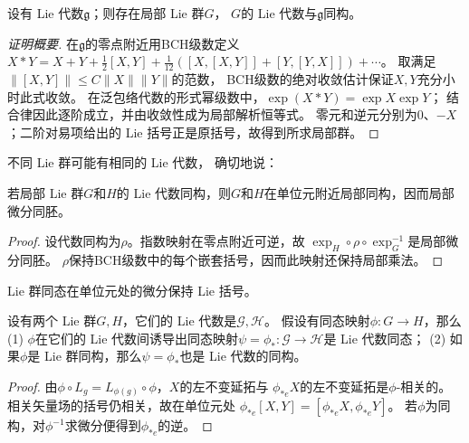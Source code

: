 \begin{theorem}\label{chlg:thm_Lie3inv}
    设有 Lie 代数$\mathfrak{g}$；则存在局部 Lie 群$G$，
    $G$的 Lie 代数与$\mathfrak{g}$同构。
\end{theorem}
\begin{proof}[证明概要]
在$\mathfrak g$的零点附近用BCH级数定义
$X*Y=X+Y+\tfrac12[X,Y]+\tfrac1{12}([X,[X,Y]]+[Y,[Y,X]])+\cdots$。
取满足$\|[X,Y]\|\leqslant C\|X\|\|Y\|$的范数，
BCH级数的绝对收敛估计保证$X,Y$充分小时此式收敛。
在泛包络代数的形式幂级数中，$\exp(X*Y)=\exp X\exp Y$；
结合律因此逐阶成立，并由收敛性成为局部解析恒等式。
零元和逆元分别为$0$、$-X$；二阶对易项给出的 Lie 括号正是原括号，故得到所求局部群。
\end{proof}

不同 Lie 群可能有相同的 Lie 代数，
确切地说：
\begin{theorem}
    若局部 Lie 群$G$和$H$的 Lie 代数同构，则$G$和$H$在单位元附近局部同构，因而局部微分同胚。
\end{theorem}
\begin{proof}
设代数同构为$\rho$。指数映射在零点附近可逆，故
$\exp_H\circ\rho\circ\exp_G^{-1}$是局部微分同胚。
$\rho$保持BCH级数中的每个嵌套括号，因而此映射还保持局部乘法。
\end{proof}

Lie 群同态在单位元处的微分保持 Lie 括号。
\begin{theorem}\label{chlg:thm_tglie}
    设有两个 Lie 群$G,H$，它们的 Lie 代数是$\mathscr{G},\mathscr{H}$。
    假设有同态映射$\phi:G\to H$，那么
    (1) $\phi$在它们的 Lie 代数间诱导出同态映射$\psi=\phi_{*}:\mathscr{G}\to \mathscr{H}$是 Lie 代数同态；
    (2) 如果$\phi$是 Lie 群同构，那么$\psi=\phi_{*}$也是 Lie 代数的同构。
\end{theorem}
\begin{proof}
由$\phi\circ L_g=L_{\phi(g)}\circ\phi$，$X$的左不变延拓与
$\phi_{*e}X$的左不变延拓是$\phi$-相关的。
相关矢量场的括号仍相关，故在单位元处
$\phi_{*e}[X,Y]=[\phi_{*e}X,\phi_{*e}Y]$。
若$\phi$为同构，对$\phi^{-1}$求微分便得到$\phi_{*e}$的逆。
\end{proof}

